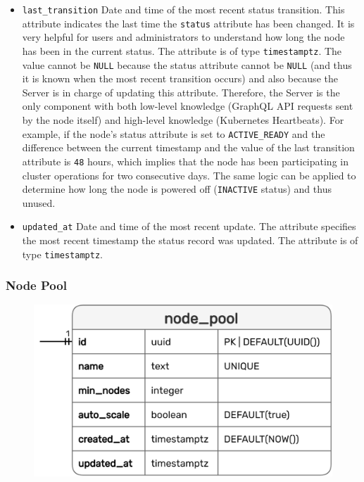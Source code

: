 \begin{itemize}
  \item \texttt{last\_transition}
    \newline
    Date and time of the most recent status transition.
    \newline
    This attribute indicates the last time the \texttt{status} attribute has
    been changed. It is very helpful for users and administrators to understand how
    long the node has been in the current status. The attribute is of type
    \texttt{timestamptz}.
    \newline
    The value cannot be \texttt{NULL} because the status attribute cannot be \texttt{NULL}
    (and thus it is known when the most recent transition occurs) and also
    because the Server is in charge of updating this attribute. Therefore, the
    Server is the only component with both low-level knowledge (GraphQL API requests
    sent by the node itself) and high-level knowledge (Kubernetes Heartbeats).
    \newline
    For example, if the node's status attribute is set to \texttt{ACTIVE\_READY}
    and the difference between the current timestamp and the value of the last transition
    attribute is \texttt{48} hours, which implies that the node has been participating
    in cluster operations for two consecutive days. The same logic can be
    applied to determine how long the node is powered off (\texttt{INACTIVE}
    status) and thus unused.

  \item \texttt{updated\_at}
    \newline
    Date and time of the most recent update.
    \newline
    The attribute specifies the most recent timestamp the status record was updated.
    \newline
    The attribute is of type \texttt{timestamptz}.
\end{itemize}

\subsubsection{Node Pool}
\label{subsubsec:implementation_server_database_node_pool}

\begin{figure}
  \centering
  \includegraphics[width=\linewidth]{images/implementation/erm_node_pool.png}
\end{figure}

